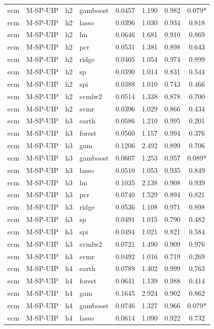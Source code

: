 \begin{ThreePartTable}
\begin{longtable}[t]{llclcccc}
ecm & M-SP-UIP & h2 & gamboost & 0.0457 & 1.190 & 0.982 & 0.079*\\
ecm & M-SP-UIP & h2 & lasso & 0.0396 & 1.030 & 0.934 & 0.818\\
ecm & M-SP-UIP & h2 & lm & 0.0646 & 1.681 & 0.910 & 0.869\\
ecm & M-SP-UIP & h2 & pcr & 0.0531 & 1.381 & 0.898 & 0.643\\
ecm & M-SP-UIP & h2 & ridge & 0.0405 & 1.054 & 0.974 & 0.899\\
ecm & M-SP-UIP & h2 & sp & 0.0390 & 1.014 & 0.831 & 0.544\\
ecm & M-SP-UIP & h2 & spi & 0.0388 & 1.010 & 0.743 & 0.466\\
ecm & M-SP-UIP & h2 & svmlw2 & 0.0514 & 1.338 & 0.878 & 0.700\\
ecm & M-SP-UIP & h2 & svmr & 0.0396 & 1.029 & 0.866 & 0.434\\
\addlinespace
ecm & M-SP-UIP & h3 & earth & 0.0586 & 1.210 & 0.995 & 0.201\\
ecm & M-SP-UIP & h3 & forest & 0.0560 & 1.157 & 0.994 & 0.376\\
ecm & M-SP-UIP & h3 & gam & 0.1206 & 2.492 & 0.899 & 0.706\\
ecm & M-SP-UIP & h3 & gamboost & 0.0607 & 1.253 & 0.957 & 0.089*\\
ecm & M-SP-UIP & h3 & lasso & 0.0510 & 1.053 & 0.935 & 0.849\\
ecm & M-SP-UIP & h3 & lm & 0.1035 & 2.138 & 0.908 & 0.939\\
ecm & M-SP-UIP & h3 & pcr & 0.0740 & 1.529 & 0.894 & 0.821\\
ecm & M-SP-UIP & h3 & ridge & 0.0536 & 1.108 & 0.971 & 0.898\\
ecm & M-SP-UIP & h3 & sp & 0.0491 & 1.015 & 0.790 & 0.482\\
ecm & M-SP-UIP & h3 & spi & 0.0494 & 1.021 & 0.821 & 0.584\\
ecm & M-SP-UIP & h3 & svmlw2 & 0.0721 & 1.490 & 0.909 & 0.976\\
ecm & M-SP-UIP & h3 & svmr & 0.0492 & 1.016 & 0.719 & 0.269\\
\addlinespace
ecm & M-SP-UIP & h4 & earth & 0.0789 & 1.402 & 0.999 & 0.763\\
ecm & M-SP-UIP & h4 & forest & 0.0641 & 1.139 & 0.988 & 0.414\\
ecm & M-SP-UIP & h4 & gam & 0.1645 & 2.924 & 0.902 & 0.862\\
ecm & M-SP-UIP & h4 & gamboost & 0.0746 & 1.327 & 0.966 & 0.079*\\
ecm & M-SP-UIP & h4 & lasso & 0.0614 & 1.090 & 0.922 & 0.732\\

\end{longtable}
\end{ThreePartTable}
